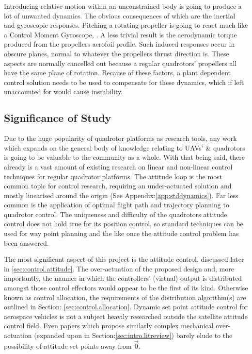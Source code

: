 \par
Introducing relative motion within an unconstrained body is going to produce a lot of unwanted dynamics. The obvious consequences of which are the inertial and gyroscopic responses. Pitching a rotating propeller is going to react much like a Control Moment Gyroscope, \cite{cmg}. A less trivial result is the aerodynamic torque produced from the propellers aerofoil profile. Such induced responses occur in obscure planes, normal to whatever the propellers thrust direction is. These aspects are normally cancelled out because a regular quadrotors' propellers all have the same plane of rotation. Because of these factors, a plant dependent control solution needs to be used to compensate for these dynamics, which if left unaccounted for would cause instability. 
\subsection{Significance of Study}
\label{subsec:intro.foreword.significance}
Due to the huge popularity of quadrotor platforms as research tools, any work which expands on the general body of knowledge relating to UAVs' \& quadrotors is going to be valuable to the community as a whole. With that being said, there already is a vast amount of existing research on linear and non-linear control techniques for regular quadrotor platforms. The attitude loop is the most common topic for control research, requiring an under-actuated solution and mostly linearised around the origin (See Appendix:\ref{app:stddynamics}). Far less common is the application of optimal flight path and trajectory planning to quadrotor control. The uniqueness and difficulty of the quadrotors attitude control does not hold true for its position control, so standard techniques can be used for way point planning and the like once the attitude control problem has been answered.
\par
The most significant aspect of this project is the attitude control, discussed later in \ref{sec:control.attitude}. The over-actuation of the proposed design and, more importantly, the manner in which the controllers' (virtual) output is distributed amongst those control effectors would appear to be the first of its kind. Otherwise known as control allocation, the requirements of the distribution algorithm(s) are outlined in Section: \ref{sec:control.allocation}. Dynamic set point attitude control for aerospace vehicles is not a subject heavily researched outside the satellite attitude control field. Even papers which propose similarly complex mechanical over-actuation (expanded upon in Section:\ref{sec:intro.litreview}) barely elude to the possibility of attitude set points away from $\vec{0}$.
